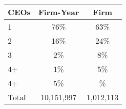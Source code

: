 \begin{tabular}{lcc}
\toprule
CEOs & Firm-Year & Firm \\
\midrule
1 & 76\% & 63\% \\
2 & 16\% & 24\% \\
3 & 2\% & 8\% \\
4+ & 1\% & 5\% \\
4+ & 5\% & \% \\
Total &   10,151,997 &    1,012,113 \\
\bottomrule
\end{tabular}
